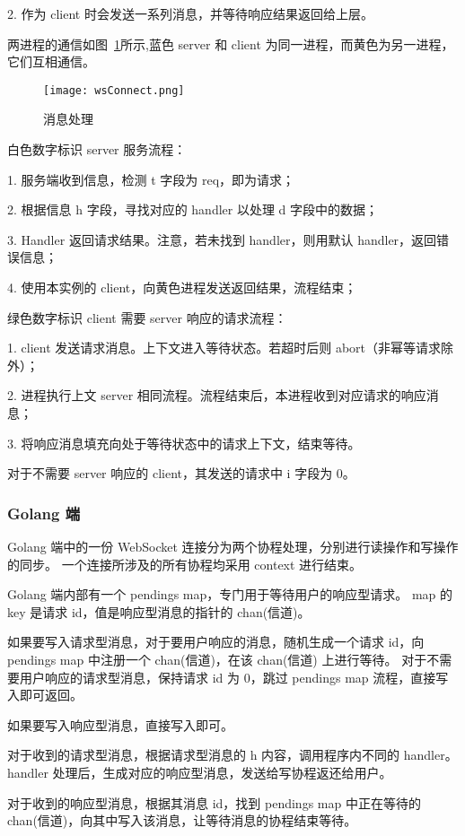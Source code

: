2. 作为 client 时会发送一系列消息，并等待响应结果返回给上层。

两进程的通信如图~\ref{fig:wsConnect}所示,蓝色 server 和 client 为同一进程，而黄色为另一进程，它们互相通信。
\begin{figure}[!htp]
    \centering
    \texttt{[image: wsConnect.png]}
    \caption{消息处理}
    \label{fig:wsConnect}
  \end{figure}

白色数字标识 server 服务流程：

1. 服务端收到信息，检测 t 字段为 req，即为请求；

2. 根据信息 h 字段，寻找对应的 handler 以处理 d 字段中的数据；

3. Handler 返回请求结果。注意，若未找到 handler，则用默认 handler，返回错误信息；

4. 使用本实例的 client，向黄色进程发送返回结果，流程结束；

绿色数字标识 client 需要 server 响应的请求流程：

1. client 发送请求消息。上下文进入等待状态。若超时后则 abort（非幂等请求除外）；

2. 进程执行上文 server 相同流程。流程结束后，本进程收到对应请求的响应消息；

3. 将响应消息填充向处于等待状态中的请求上下文，结束等待。

对于不需要 server 响应的 client，其发送的请求中 i 字段为 0。

\subsubsection{Golang 端}
Golang 端中的一份 WebSocket 连接分为两个协程处理，分别进行读操作和写操作的同步。
一个连接所涉及的所有协程均采用 context 进行结束。

Golang 端内部有一个 pendings map，专门用于等待用户的响应型请求。
map 的 key 是请求 id，值是响应型消息的指针的 chan(信道)。

如果要写入请求型消息，对于要用户响应的消息，随机生成一个请求 id，向 pendings map 中注册一个 chan(信道)，在该 chan(信道) 上进行等待。
对于不需要用户响应的请求型消息，保持请求 id 为 0，跳过 pendings map 流程，直接写入即可返回。

如果要写入响应型消息，直接写入即可。

对于收到的请求型消息，根据请求型消息的 h 内容，调用程序内不同的 handler。handler 处理后，生成对应的响应型消息，发送给写协程返还给用户。

对于收到的响应型消息，根据其消息 id，找到 pendings map 中正在等待的 chan(信道)，向其中写入该消息，让等待消息的协程结束等待。

